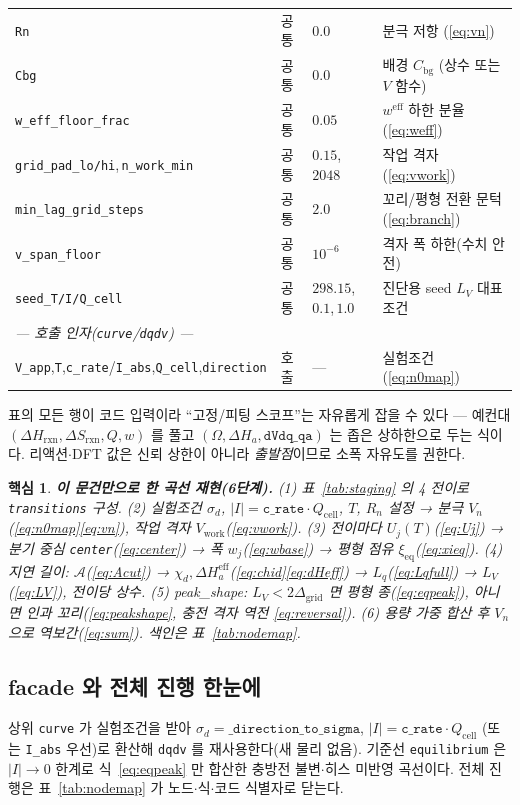 \documentclass[11pt,a4paper]{article}
\newtheorem*{keybox}{핵심}
\newcommand{\eff}{\mathrm{eff}}
\newcommand{\eq}{\mathrm{eq}}
\newcommand{\cell}{\mathrm{cell}}
\newcommand{\bg}{\mathrm{bg}}
\newcommand{\rxn}{\mathrm{rxn}}
\newcommand{\work}{\mathrm{work}}
\newcommand{\code}[1]{\texttt{#1}}
\begin{document}
\begin{table}[t]
\begin{tabular}{l l l l}
\code{Rn} & 공통 & $0.0$ & 분극 저항 (\eqref{eq:vn}) \\
\code{Cbg} & 공통 & $0.0$ & 배경 $C_\bg$ (상수 또는 $V$ 함수) \\
\code{w\_eff\_floor\_frac} & 공통 & $0.05$ & $w^\eff$ 하한 분율 (\eqref{eq:weff}) \\
\code{grid\_pad\_lo/hi},\,\code{n\_work\_min} & 공통 & $0.15$,\,$2048$ & 작업 격자 (\eqref{eq:vwork}) \\
\code{min\_lag\_grid\_steps} & 공통 & $2.0$ & 꼬리/평형 전환 문턱 (\eqref{eq:branch}) \\
\code{v\_span\_floor} & 공통 & $10^{-6}$ & 격자 폭 하한(수치 안전) \\
\code{seed\_T/I/Q\_cell} & 공통 & $298.15$,\,$0.1$,\,$1.0$ & 진단용 seed $L_V$ 대표 조건 \\
\multicolumn{4}{l}{\emph{— 호출 인자(\code{curve}/\code{dqdv}) —}}\\
\code{V\_app},\code{T},\code{c\_rate}/\code{I\_abs},\code{Q\_cell},\code{direction} & 호출 & --- & 실험조건 (\eqref{eq:n0map}) \\
\bottomrule
\end{tabular}
\end{table}

표의 모든 행이 코드 입력이라 ``고정/피팅 스코프''는 자유롭게 잡을 수 있다 — 예컨대 $(\Delta H_\rxn,\Delta S_\rxn,Q,w)$ 를
풀고 $(\Omega,\Delta H_a,\code{dVdq\_qa})$ 는 좁은 상하한으로 두는 식이다. 리액션$\cdot$DFT 값은 신뢰 상한이 아니라
\emph{출발점}이므로 소폭 자유도를 권한다.

\begin{keybox}
\textbf{이 문건만으로 한 곡선 재현(6단계).}
(1) 표~\ref{tab:staging} 의 4 전이로 \code{transitions} 구성.
(2) 실험조건 $\sigma_d$, $|I|=\code{c\_rate}\cdot Q_\cell$, $T$, $R_n$ 설정 → 분극 $V_n$(\eqref{eq:n0map}\eqref{eq:vn}), 작업 격자 $V_\work$(\eqref{eq:vwork}).
(3) 전이마다 $U_j(T)$(\eqref{eq:Uj}) → 분기 중심 \code{center}(\eqref{eq:center}) → 폭 $w_j$(\eqref{eq:wbase}) → 평형 점유 $\xi_\eq$(\eqref{eq:xieq}).
(4) 지연 길이: $\mathcal A$(\eqref{eq:Acut}) → $\chi_d,\Delta H_a^\eff$(\eqref{eq:chid}\eqref{eq:dHeff}) → $L_q$(\eqref{eq:Lqfull}) → $L_V$(\eqref{eq:LV}), 전이당 상수.
(5) peak\_shape: $L_V<2\Delta_\mathrm{grid}$ 면 평형 종(\eqref{eq:eqpeak}), 아니면 인과 꼬리(\eqref{eq:peakshape}, 충전 격자 역전 \eqref{eq:reversal}).
(6) 용량 가중 합산 후 $V_n$ 으로 역보간(\eqref{eq:sum}). 색인은 표~\ref{tab:nodemap}.
\end{keybox}

\subsection{facade 와 전체 진행 한눈에}
상위 \code{curve} 가 실험조건을 받아 $\sigma_d=\code{\_direction\_to\_sigma}$, $|I|=\code{c\_rate}\cdot Q_\cell$
(또는 \code{I\_abs} 우선)로 환산해 \code{dqdv} 를 재사용한다(새 물리 없음). 기준선 \code{equilibrium} 은
$|I|\to0$ 한계로 식~\eqref{eq:eqpeak} 만 합산한 충방전 불변$\cdot$히스 미반영 곡선이다. 전체 진행은 표~\ref{tab:nodemap}
가 노드$\cdot$식$\cdot$코드 식별자로 닫는다.
\end{document}
